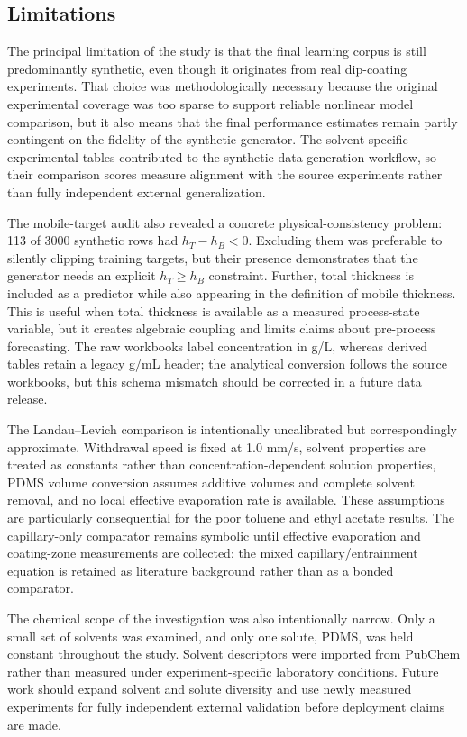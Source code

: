 \documentclass[11pt]{article}
\begin{document}
\subsection{Limitations}
The principal limitation of the study is that the final learning corpus is still predominantly synthetic, even though it originates from real dip-coating experiments. That choice was methodologically necessary because the original experimental coverage was too sparse to support reliable nonlinear model comparison, but it also means that the final performance estimates remain partly contingent on the fidelity of the synthetic generator. The solvent-specific experimental tables contributed to the synthetic data-generation workflow, so their comparison scores measure alignment with the source experiments rather than fully independent external generalization.

The mobile-target audit also revealed a concrete physical-consistency problem: 113 of 3000 synthetic rows had $h_T-h_B<0$. Excluding them was preferable to silently clipping training targets, but their presence demonstrates that the generator needs an explicit $h_T\ge h_B$ constraint. Further, total thickness is included as a predictor while also appearing in the definition of mobile thickness. This is useful when total thickness is available as a measured process-state variable, but it creates algebraic coupling and limits claims about pre-process forecasting. The raw workbooks label concentration in g/L, whereas derived tables retain a legacy g/mL header; the analytical conversion follows the source workbooks, but this schema mismatch should be corrected in a future data release.

The Landau--Levich comparison is intentionally uncalibrated but correspondingly approximate. Withdrawal speed is fixed at 1.0 mm/s, solvent properties are treated as constants rather than concentration-dependent solution properties, PDMS volume conversion assumes additive volumes and complete solvent removal, and no local effective evaporation rate is available. These assumptions are particularly consequential for the poor toluene and ethyl acetate results. The capillary-only comparator remains symbolic until effective evaporation and coating-zone measurements are collected; the mixed capillary/entrainment equation is retained as literature background rather than as a bonded comparator.

The chemical scope of the investigation was also intentionally narrow. Only a small set of solvents was examined, and only one solute, PDMS, was held constant throughout the study. Solvent descriptors were imported from PubChem rather than measured under experiment-specific laboratory conditions. Future work should expand solvent and solute diversity and use newly measured experiments for fully independent external validation before deployment claims are made.
\end{document}
